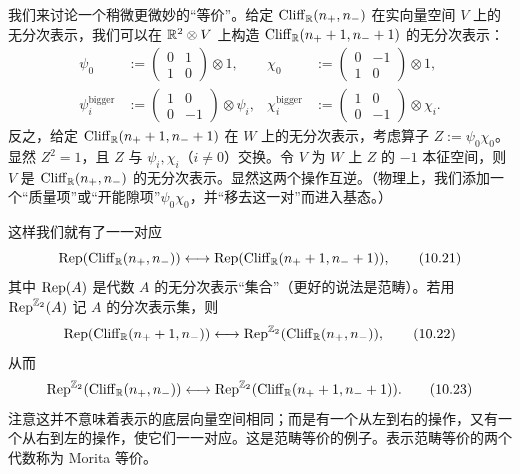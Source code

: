 我们来讨论一个稍微更微妙的“等价”。给定 $\mathrm{Cliff}_{\mathbb{R}}(n_+,n_-)$ 在实向量空间 $V$ 上的无分次表示，我们可以在 $\mathbb{R}^2\otimes V$ 上构造 $\mathrm{Cliff}_{\mathbb{R}}(n_++1,n_-+1)$ 的无分次表示：
\begin{equation}
  \begin{aligned}
    \psi_0&:=\begin{pmatrix}0&1\\1&0\end{pmatrix}\otimes 1,
    &\chi_0&:=\begin{pmatrix}0&-1\\1&0\end{pmatrix}\otimes 1,\\
    \psi_i^{\text{bigger}}&:=\begin{pmatrix}1&0\\0&-1\end{pmatrix}\otimes\psi_i,
    &\chi_i^{\text{bigger}}&:=\begin{pmatrix}1&0\\0&-1\end{pmatrix}\otimes\chi_i.
  \end{aligned}
  \tag{10.20}
\end{equation}
反之，给定 $\mathrm{Cliff}_{\mathbb{R}}(n_++1,n_-+1)$ 在 $W$ 上的无分次表示，考虑算子 $Z:=\psi_0\chi_0$。显然 $Z^2=1$，且 $Z$ 与 $\psi_i,\chi_i$（$i\neq0$）交换。令 $V$ 为 $W$ 上 $Z$ 的 $-1$ 本征空间，则 $V$ 是 $\mathrm{Cliff}_{\mathbb{R}}(n_+,n_-)$ 的无分次表示。显然这两个操作互逆。（物理上，我们添加一个“质量项”或“开能隙项”$\psi_0\chi_0$，并“移去这一对”而进入基态。）

这样我们就有了一一对应
\begin{equation}
  \operatorname{Rep}(\mathrm{Cliff}_{\mathbb{R}}(n_+,n_-))
  \longleftrightarrow \operatorname{Rep}(\mathrm{Cliff}_{\mathbb{R}}(n_++1,n_-+1)),
  \tag{10.21}
\end{equation}
其中 $\operatorname{Rep}(A)$ 是代数 $A$ 的无分次表示“集合”（更好的说法是范畴）。若用 $\operatorname{Rep}^{\mathbb{Z}_2}(A)$ 记 $A$ 的分次表示集，则
\begin{equation}
  \operatorname{Rep}(\mathrm{Cliff}_{\mathbb{R}}(n_++1,n_-))
  \longleftrightarrow \operatorname{Rep}^{\mathbb{Z}_2}(\mathrm{Cliff}_{\mathbb{R}}(n_+,n_-)),
  \tag{10.22}
\end{equation}
从而
\begin{equation}
  \operatorname{Rep}^{\mathbb{Z}_2}(\mathrm{Cliff}_{\mathbb{R}}(n_+,n_-))
  \longleftrightarrow \operatorname{Rep}^{\mathbb{Z}_2}(\mathrm{Cliff}_{\mathbb{R}}(n_++1,n_-+1)).
  \tag{10.23}
\end{equation}
注意这并不意味着表示的底层向量空间相同；而是有一个从左到右的操作，又有一个从右到左的操作，使它们一一对应。这是范畴等价的例子。表示范畴等价的两个代数称为 Morita 等价。


